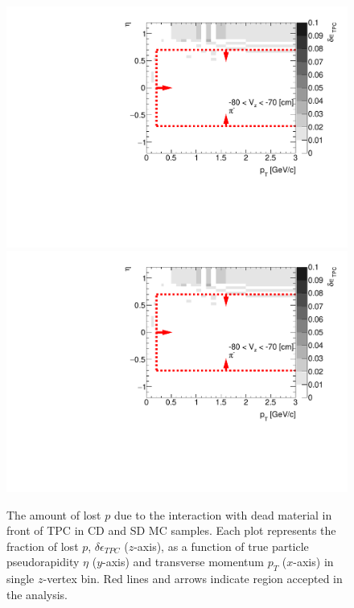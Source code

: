 \begin{figure}[H]
	\caption[The amount of lost $p$ due to the interaction with dead material in front of TPC as a function of $p_T$, $\eta$ and $z$-vertex in CD and SD]{The amount of lost $p$ due to the interaction with dead material in front of TPC in CD and SD MC samples. Each plot represents the fraction of lost $p$, $\delta\epsilon_{ TPC}$ ($z$-axis), as a function of true particle pseudorapidity $\eta$ ($y$-axis) and transverse momentum $p_{T}$ ($x$-axis) in single $z$-vertex bin. Red lines and arrows indicate region accepted in the analysis.}\label{fig:dead_materialCDSD3Dp}
	\parbox{0.325\textwidth}{
		\includegraphics[width=\linewidth,page=81]{graphics/systematicsEfficiency/deadMaterial/secondaries_Unbinned_SDCD_.pdf}\\
		\includegraphics[width=\linewidth,page=84]{graphics/systematicsEfficiency/deadMaterial/secondaries_Unbinned_SDCD_.pdf}\\
}
\end{figure}
